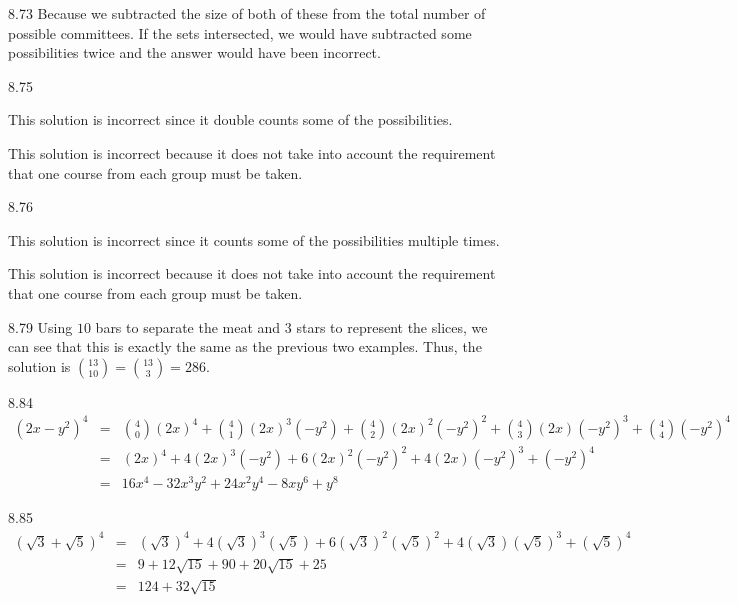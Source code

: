 \begin{Answer}{8.73}
Because we subtracted the size of both of these from the total number of possible
committees.  If the sets intersected, we would have subtracted some possibilities twice
and the answer would have been incorrect.
\end{Answer}
\begin{Answer}{8.75}
\begin{solevalenum}
\item
This solution is incorrect since it double counts some of the possibilities.
\item
This solution is incorrect because it does not take into account the requirement
that one course from each group must be taken.
\end{solevalenum}
\end{Answer}
\begin{Answer}{8.76}
\begin{solevalenum}
\item
This solution is incorrect since it counts some of the possibilities multiple times.
\item
This solution is incorrect because it does not take into account the requirement
that one course from each group must be taken.
\end{solevalenum}
\end{Answer}
\begin{Answer}{8.79}
Using $10$ bars to separate the meat and $3$ stars to represent the slices,
we can see that this is exactly the same as the previous two examples.  Thus,
the solution is $\binom{13}{10}=\binom{13}{3}=286.$
\end{Answer}
\begin{Answer}{8.84}
\begin{eqnarray*}
(2x - y^2)^4 &\!\! = & \!\!\!\! \binom{4}{0}(2x)^4 + \binom{4}{1}(2x)^3(-y^2) + \binom{4}{2}(2x)^2(-y^2)^2 + \binom{4}{3}(2x)(-y^2)^3 + \binom{4}{4}(-y^2)^4 \\
 & = & (2x)^4 + 4(2x)^3(-y^2) + 6(2x)^2(-y^2)^2 + 4(2x)(-y^2)^3 + (-y^2)^4 \\
& = & 16x^4 - 32x^3y^2 + 24x^2y^4 - 8xy^6 + y^8
\end{eqnarray*}
\end{Answer}
\begin{Answer}{8.85}
$$
\begin{array}{lll}
(\sqrt{3} + \sqrt{5})^4 & = & (\sqrt{3})^4 +
4(\sqrt{3})^3(\sqrt{5})  + 6(\sqrt{3})^2(\sqrt{5})^2
+ 4(\sqrt{3})(\sqrt{5})^3 + (\sqrt{5})^4 \\
& = & 9 + 12\sqrt{15} + 90 +  20\sqrt{15} + 25 \\
& = & 124 + 32\sqrt{15}
\end{array}
$$
\end{Answer}
